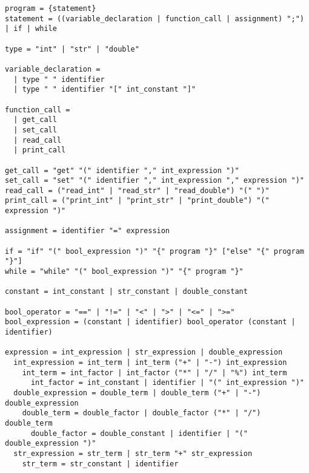 \documentclass[11pt]{article}
\author{Alex Pop}
\date{\today}
\title{}
\begin{document}
\tableofcontents

\begin{verbatim}
program = {statement}
statement = ((variable_declaration | function_call | assignment) ";") | if | while

type = "int" | "str" | "double"

variable_declaration =
  | type " " identifier
  | type " " identifier "[" int_constant "]"

function_call =
  | get_call
  | set_call
  | read_call
  | print_call

get_call = "get" "(" identifier "," int_expression ")"
set_call = "set" "(" identifier "," int_expression "," expression ")"
read_call = ("read_int" | "read_str" | "read_double") "(" ")"
print_call = ("print_int" | "print_str" | "print_double") "(" expression ")"

assignment = identifier "=" expression

if = "if" "(" bool_expression ")" "{" program "}" ["else" "{" program "}"]
while = "while" "(" bool_expression ")" "{" program "}"

constant = int_constant | str_constant | double_constant

bool_operator = "==" | "!=" | "<" | ">" | "<=" | ">="
bool_expression = (constant | identifier) bool_operator (constant | identifier)

expression = int_expression | str_expression | double_expression
  int_expression = int_term | int_term ("+" | "-") int_expression
    int_term = int_factor | int_factor ("*" | "/" | "%") int_term 
      int_factor = int_constant | identifier | "(" int_expression ")"
  double_expression = double_term | double_term ("+" | "-") double_expression
    double_term = double_factor | double_factor ("*" | "/") double_term 
      double_factor = double_constant | identifier | "(" double_expression ")"
  str_expression = str_term | str_term "+" str_expression
    str_term = str_constant | identifier
\end{verbatim}
\end{document}
